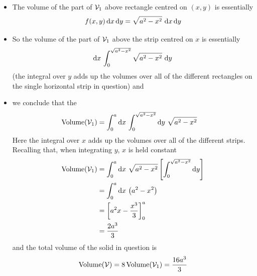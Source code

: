\begin{eg}[Volume]
\begin{itemize}
\item
  The volume of the part of $\mathcal{V}_1$ above rectangle centred on $(x,y)$
        is essentially 
   \begin{equation*}
       f(x,y)\,\dee{x}\,\dee{y}=\sqrt{a^2-x^2}\ \dee{x}\,\dee{y}
   \end{equation*}
\item 
   So the volume of the part of $\mathcal{V}_1$ above the strip centred on $x$ is 
         essentially 
       \begin{equation*}
         \mathrm{d}x\, \int_0^{\sqrt{a^2-x^2}} \sqrt{a^2-x^2}\ \mathrm{d}y
       \end{equation*} 
   (the integral over $y$ adds up the volumes over all of the 
       different rectangles on the single horizontal strip in question) and  
\item
   we conclude that the
\begin{align*}
    \text{Volume}(\cV_1)
        &=\int_0^a \dee{x}\, \int_0^{\sqrt{a^2-x^2}}\dee{y}\ \sqrt{a^2-x^2}
\end{align*}
Here the integral over $x$ adds up the volumes over all 
of the different strips.
Recalling that, when integrating $y$, $x$ is held constant
\begin{align*}
\text{Volume}(\mathcal{V}_1)
        &=\int_0^a \mathrm{d}x\  \sqrt{a^2-x^2}\left[
                 \int_0^{\sqrt{a^2-x^2}} \mathrm{d}y \right] \\
        &=\int_0^a \mathrm{d}x\  \big(a^2-x^2\big) \\
        &=\left[a^2x-\frac{x^3}{3}\right]_0^a \\
        &=\frac{2a^3}{3}
\end{align*}
and the total volume of the solid in question is
\begin{equation*}
\text{Volume}(\mathcal{V})
=8\,\text{Volume}(\mathcal{V}_1)
=\frac{16a^3}{3}
\end{equation*}
\end{itemize}

\end{eg}

